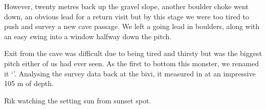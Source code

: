 However, twenty metres back up the gravel slope, another boulder choke
went down, an obvious lead for a return visit but by this stage we were
too tired to push and survey a new cave passage. We left a going lead in
boulders, along with an easy swing into a window halfway down the pitch.

Exit from the cave was difficult due to being tired and thirsty but   was the biggest pitch either of us had ever seen. As the first to bottom
this monster, we renamed it `'. Analysing the survey data back at the bivi, it measured in at an
impressive 105 m of depth.


\begin{pagefigure}
      \checkoddpage \ifoddpage \forcerectofloat \else \forceversofloat \fi
      \centering
  \caption{Rik watching the setting sun from sunset spot. }
\end{pagefigure}

